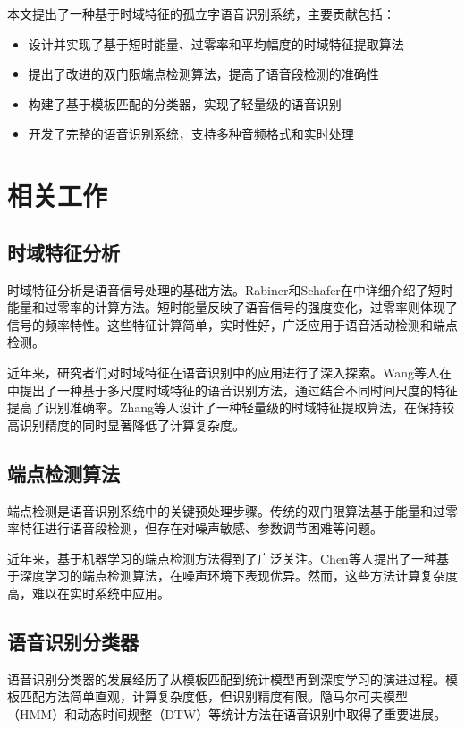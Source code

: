 \documentclass[sigconf,nonacm]{acmart}
\begin{document}
本文提出了一种基于时域特征的孤立字语音识别系统，主要贡献包括：

\begin{itemize}
\item 设计并实现了基于短时能量、过零率和平均幅度的时域特征提取算法
\item 提出了改进的双门限端点检测算法，提高了语音段检测的准确性
\item 构建了基于模板匹配的分类器，实现了轻量级的语音识别
\item 开发了完整的语音识别系统，支持多种音频格式和实时处理
\end{itemize}

\section{相关工作}

\subsection{时域特征分析}

时域特征分析是语音信号处理的基础方法。Rabiner和Schafer在\cite{rabiner1978digital}中详细介绍了短时能量和过零率的计算方法。短时能量反映了语音信号的强度变化，过零率则体现了信号的频率特性。这些特征计算简单，实时性好，广泛应用于语音活动检测和端点检测。

近年来，研究者们对时域特征在语音识别中的应用进行了深入探索。Wang等人在\cite{wang2019time}中提出了一种基于多尺度时域特征的语音识别方法，通过结合不同时间尺度的特征提高了识别准确率。Zhang等人\cite{zhang2020efficient}设计了一种轻量级的时域特征提取算法，在保持较高识别精度的同时显著降低了计算复杂度。

\subsection{端点检测算法}

端点检测是语音识别系统中的关键预处理步骤。传统的双门限算法基于能量和过零率特征进行语音段检测，但存在对噪声敏感、参数调节困难等问题。

近年来，基于机器学习的端点检测方法得到了广泛关注。Chen等人\cite{chen2021deep}提出了一种基于深度学习的端点检测算法，在噪声环境下表现优异。然而，这些方法计算复杂度高，难以在实时系统中应用。

\subsection{语音识别分类器}

语音识别分类器的发展经历了从模板匹配到统计模型再到深度学习的演进过程。模板匹配方法简单直观，计算复杂度低，但识别精度有限。隐马尔可夫模型（HMM）和动态时间规整（DTW）等统计方法在语音识别中取得了重要进展。
\end{document}

